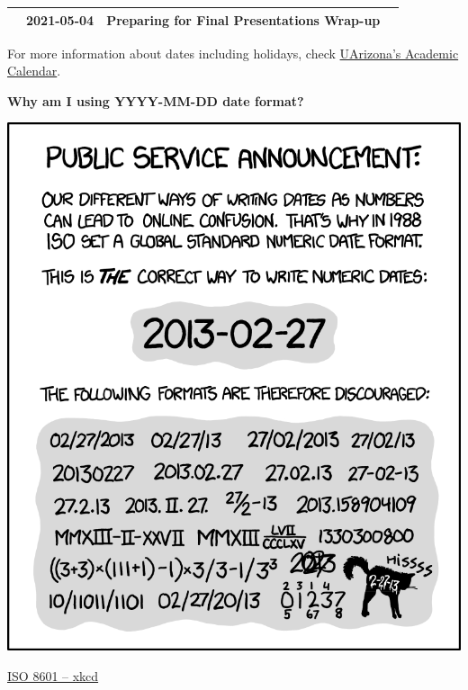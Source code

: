 \documentclass[
]{book}
\begin{document}
\begin{longtable}[]{@{}llll@{}}
\begin{minipage}[t]{0.22\columnwidth}\raggedright
\strut
\end{minipage} & \begin{minipage}[t]{0.22\columnwidth}\raggedright
2021-05-04\strut
\end{minipage} & \begin{minipage}[t]{0.22\columnwidth}\raggedright
Preparing for Final Presentations Wrap-up\strut
\end{minipage} & \begin{minipage}[t]{0.22\columnwidth}\raggedright
\strut
\end{minipage}\tabularnewline
\bottomrule
\end{longtable}

For more information about dates including holidays, check \href{https://catalog.arizona.edu/calendar/2020-2021-academic-calendar}{UArizona's Academic Calendar}.

\textbf{Why am I using YYYY-MM-DD date format?}

\includegraphics[width=10.89in]{images/iso_8601_2x}

\href{https://xkcd.com/1179/}{ISO 8601 -- xkcd}
\end{document}
